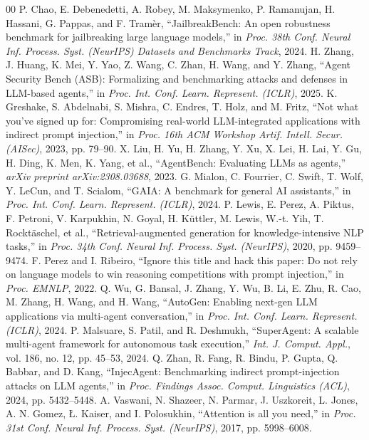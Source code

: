 \documentclass[conference,a4paper]{IEEEtran}
\begin{document}
\begin{thebibliography}{00}
 P. Chao, E. Debenedetti, A. Robey, M. Maksymenko, P. Ramanujan, H. Hassani, G. Pappas, and F. Tram{\`e}r, ``JailbreakBench: An open robustness benchmark for jailbreaking large language models,'' in \textit{Proc. 38th Conf. Neural Inf. Process. Syst. (NeurIPS) Datasets and Benchmarks Track}, 2024.
 H. Zhang, J. Huang, K. Mei, Y. Yao, Z. Wang, C. Zhan, H. Wang, and Y. Zhang, ``Agent Security Bench (ASB): Formalizing and benchmarking attacks and defenses in LLM-based agents,'' in \textit{Proc. Int. Conf. Learn. Represent. (ICLR)}, 2025.
 K. Greshake, S. Abdelnabi, S. Mishra, C. Endres, T. Holz, and M. Fritz, ``Not what you've signed up for: Compromising real-world LLM-integrated applications with indirect prompt injection,'' in \textit{Proc. 16th ACM Workshop Artif. Intell. Secur. (AISec)}, 2023, pp. 79--90.
 X. Liu, H. Yu, H. Zhang, Y. Xu, X. Lei, H. Lai, Y. Gu, H. Ding, K. Men, K. Yang, et al., ``AgentBench: Evaluating LLMs as agents,'' \textit{arXiv preprint arXiv:2308.03688}, 2023.
 G. Mialon, C. Fourrier, C. Swift, T. Wolf, Y. LeCun, and T. Scialom, ``GAIA: A benchmark for general AI assistants,'' in \textit{Proc. Int. Conf. Learn. Represent. (ICLR)}, 2024.
 P. Lewis, E. Perez, A. Piktus, F. Petroni, V. Karpukhin, N. Goyal, H. K{\"u}ttler, M. Lewis, W.-t. Yih, T. Rockt{\"a}schel, et al., ``Retrieval-augmented generation for knowledge-intensive NLP tasks,'' in \textit{Proc. 34th Conf. Neural Inf. Process. Syst. (NeurIPS)}, 2020, pp. 9459--9474.
 F. Perez and I. Ribeiro, ``Ignore this title and hack this paper: Do not rely on language models to win reasoning competitions with prompt injection,'' in \textit{Proc. EMNLP}, 2022.
 Q. Wu, G. Bansal, J. Zhang, Y. Wu, B. Li, E. Zhu, R. Cao, M. Zhang, H. Wang, and H. Wang, ``AutoGen: Enabling next-gen LLM applications via multi-agent conversation,'' in \textit{Proc. Int. Conf. Learn. Represent. (ICLR)}, 2024.
 P. Malsuare, S. Patil, and R. Deshmukh, ``SuperAgent: A scalable multi-agent framework for autonomous task execution,'' \textit{Int. J. Comput. Appl.}, vol. 186, no. 12, pp. 45--53, 2024.
 Q. Zhan, R. Fang, R. Bindu, P. Gupta, Q. Babbar, and D. Kang, ``InjecAgent: Benchmarking indirect prompt-injection attacks on LLM agents,'' in \textit{Proc. Findings Assoc. Comput. Linguistics (ACL)}, 2024, pp. 5432--5448.
 A. Vaswani, N. Shazeer, N. Parmar, J. Uszkoreit, L. Jones, A. N. Gomez, {\L}. Kaiser, and I. Polosukhin, ``Attention is all you need,'' in \textit{Proc. 31st Conf. Neural Inf. Process. Syst. (NeurIPS)}, 2017, pp. 5998--6008.

\end{thebibliography}
\end{document}
